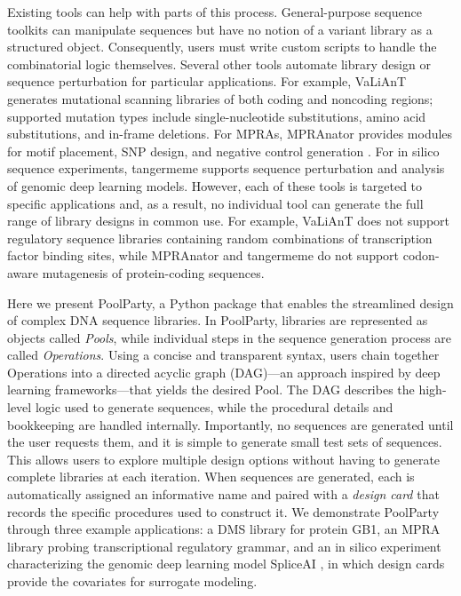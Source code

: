 \documentclass[pdflatex,sn-vancouver-num,referee,oneside]{sn-jnl}
\newif\ifshowquoted
\newcommand{\quoted}[1]{\ifshowquoted\textcolor{quotedtext}{#1}\else#1\fi}
\begin{document}
\quoted{Existing tools can help with parts of this process. General-purpose sequence toolkits \citep{Cock2009df, Pereira2015wj, Klie2023kg} can manipulate sequences but have no notion of a variant library as a structured object. Consequently, users must write custom scripts to handle the combinatorial logic themselves. Several other tools automate library design or sequence perturbation for particular applications. For example, VaLiAnT \citep{Barbon2022th} generates mutational scanning libraries of both coding and noncoding regions; supported mutation types include single-nucleotide substitutions, amino acid substitutions, and in-frame deletions. For MPRAs, MPRAnator \citep{GeorgakopoulosSoares2017gb} provides modules for motif placement, SNP design, and negative control generation \citep[see also][]{Ghazi2018aa}. For in silico sequence experiments, tangermeme \citep{Schreiber2025nd} supports sequence perturbation and analysis of genomic deep learning models. However, each of these tools is targeted to specific applications and, as a result, no individual tool can generate the full range of library designs in common use. For example, VaLiAnT does not support regulatory sequence libraries containing random combinations of transcription factor binding sites, while MPRAnator and tangermeme do not support codon-aware mutagenesis of protein-coding sequences.}

Here we present PoolParty, a Python package that enables the streamlined design of complex DNA sequence libraries. In PoolParty, libraries are represented as objects called \emph{Pools}, while individual steps in the sequence generation process are called \emph{Operations}. Using a concise and transparent syntax, users chain together Operations into a directed acyclic graph (DAG)---an approach inspired by deep learning frameworks---that yields the desired Pool. The DAG describes the high-level logic used to generate sequences, while the procedural details and bookkeeping are handled internally. \quoted{Importantly, no sequences are generated until the user requests them, and it is simple to generate small test sets of sequences. This allows users to explore multiple design options without having to generate complete libraries at each iteration.} When sequences are generated, each is automatically assigned an informative name and paired with a \emph{design card} that records the specific procedures used to construct it. We demonstrate PoolParty through three example applications: a DMS library for protein GB1, an MPRA library probing transcriptional regulatory grammar, and an in silico experiment characterizing the genomic deep learning model SpliceAI \citep{Jaganathan2019ps}, in which design cards provide the covariates for surrogate modeling.
\end{document}
